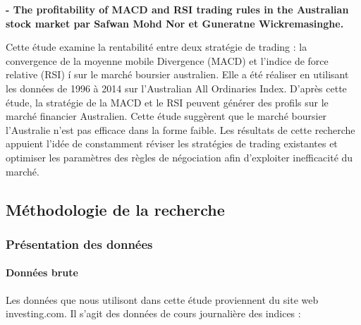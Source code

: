 \textbf{- The profitability of MACD and RSI trading rules in the
Australian stock market par Safwan Mohd Nor et Guneratne
Wickremasinghe.}

{ Cette étude examine la rentabilité entre deux stratégie de trading :
la convergence de la moyenne mobile Divergence (MACD) et l'indice de
force relative (RSI) í sur le marché boursier australien. Elle a été
réaliser en utilisant les données de 1996 à 2014 sur l'Australian All
Ordinaries Index. D'après cette étude, la stratégie de la MACD et le RSI
peuvent générer des profils sur le marché financier Australien. Cette
étude suggèrent que le marché boursier l'Australie n'est pas efficace
dans la forme faible. Les résultats de cette recherche appuient l'idée
de constamment réviser les stratégies de trading existantes et optimiser
les paramètres des règles de négociation afin d'exploiter inefficacité
du marché.}

\subsection{Méthodologie de la
recherche}\label{muxe9thodologie-de-la-recherche}

\subsubsection{\texorpdfstring{ Présentation des données
}{ Présentation des données }}\label{pruxe9sentation-des-donnuxe9es}

\paragraph{Données brute}\label{donnuxe9es-brute}

{ Les données que nous utilisont dans cette étude proviennent du site
web investing.com. Il s'agit des données de cours journalière des
indices : }


